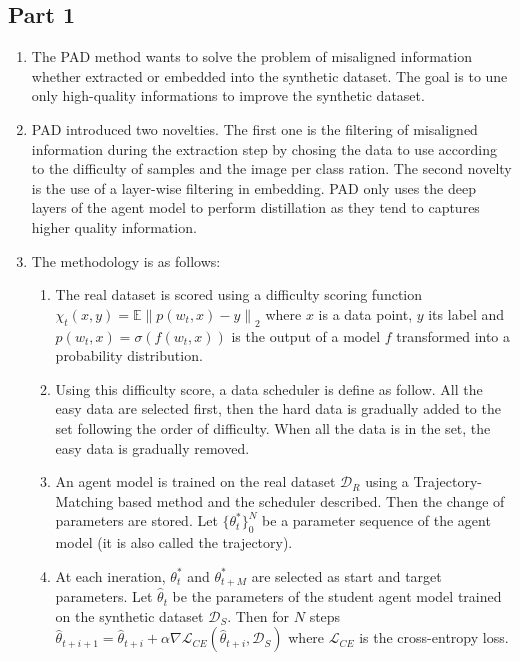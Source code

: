 \documentclass[onecolumn]{IEEEtran}
\begin{document}
\subsection{Part 1}
\begin{enumerate}[label=(\alph*)]
    \item The PAD method wants to solve the problem of misaligned information whether extracted or embedded into the synthetic dataset. The goal is to une only high-quality informations to improve the synthetic dataset.
    \vspace{3mm}
    \item PAD introduced two novelties. The first one is the filtering of misaligned information during the extraction step by chosing the data to use according to the difficulty of samples and the image per class ration. The second novelty is the use of a layer-wise filtering in embedding. PAD only uses the deep layers of the agent model to perform distillation as they tend to captures higher quality information.
    \vspace{3mm}
    \item The methodology is as follows:
    \begin{enumerate}[label=(\arabic*)]
        \item The real dataset is scored using a difficulty scoring function $\chi_t(x, y) = \mathbb{E} \left\| p(w_t, x) - y \right\|_2$ where $x$ is a data point, $y$ its label and $p(w_t,x)=\sigma(f(w_t, x))$ is the output of a model $f$ transformed into a probability distribution.
        \item Using this difficulty score, a data scheduler is define as follow. All the easy data are selected first, then the hard data is gradually added to the set following the order of difficulty. When all the data is in the set, the easy data is gradually removed.
        \item An agent model is trained on the real dataset $\mathcal{D}_R$ using a Trajectory-Matching based method and the scheduler described. Then the change of parameters are stored. Let $\{\theta_t^*\}_0^N$ be a parameter sequence of the agent model (it is also called the trajectory). 
        \item At each ineration, $\theta_t^*$ and $\theta_{t+M}^*$ are selected as start and target parameters. Let $\hat\theta_t$ be the parameters of the student agent model trained on the synthetic dataset $\mathcal{D}_S$. Then for $N$ steps $\hat\theta_{t+i+1} = \hat\theta_{t+i} + \alpha \nabla\mathcal{L}_{CE}(\hat\theta_{t+i}, \mathcal{D}_S)$ where $\mathcal{L}_{CE}$ is the cross-entropy loss.

\end{enumerate}
\end{enumerate}
\end{document}
